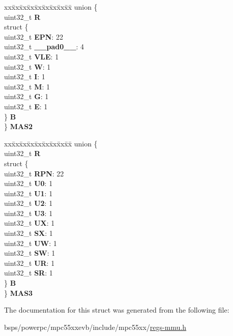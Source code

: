 \begin{DoxyCompactItemize}
\begin{tabbing}
\end{tabbing}\item 
\mbox{\label{structMMU__tag_a8aad443110f4812c730b85641c8d3217}} 
\begin{tabbing}
xx\=xx\=xx\=xx\=xx\=xx\=xx\=xx\=xx\=\kill
union \{\\
\>uint32\_t {\bfseries R}\\
\>struct \{\\
\>\>uint32\_t {\bfseries EPN}: 22\\
\>\>uint32\_t {\bfseries \_\_pad0\_\_}: 4\\
\>\>uint32\_t {\bfseries VLE}: 1\\
\>\>uint32\_t {\bfseries W}: 1\\
\>\>uint32\_t {\bfseries I}: 1\\
\>\>uint32\_t {\bfseries M}: 1\\
\>\>uint32\_t {\bfseries G}: 1\\
\>\>uint32\_t {\bfseries E}: 1\\
\>\} {\bfseries B}\\
\} {\bfseries MAS2}\\

\end{tabbing}\item 
\mbox{\label{structMMU__tag_aaa71348ee08ce8c646e6a4eca0c79df0}} 
\begin{tabbing}
xx\=xx\=xx\=xx\=xx\=xx\=xx\=xx\=xx\=\kill
union \{\\
\>uint32\_t {\bfseries R}\\
\>struct \{\\
\>\>uint32\_t {\bfseries RPN}: 22\\
\>\>uint32\_t {\bfseries U0}: 1\\
\>\>uint32\_t {\bfseries U1}: 1\\
\>\>uint32\_t {\bfseries U2}: 1\\
\>\>uint32\_t {\bfseries U3}: 1\\
\>\>uint32\_t {\bfseries UX}: 1\\
\>\>uint32\_t {\bfseries SX}: 1\\
\>\>uint32\_t {\bfseries UW}: 1\\
\>\>uint32\_t {\bfseries SW}: 1\\
\>\>uint32\_t {\bfseries UR}: 1\\
\>\>uint32\_t {\bfseries SR}: 1\\
\>\} {\bfseries B}\\
\} {\bfseries MAS3}\\

\end{tabbing}\end{DoxyCompactItemize}


The documentation for this struct was generated from the following file\+:\begin{DoxyCompactItemize}
\item 
bsps/powerpc/mpc55xxevb/include/mpc55xx/\mbox{\hyperlink{regs-mmu_8h}{regs-\/mmu.\+h}}\end{DoxyCompactItemize}

